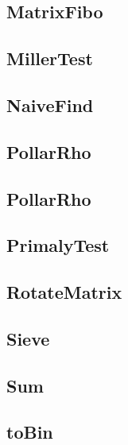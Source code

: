 \subsection{ MatrixFibo}
\raggedbottom
\hrulefill
\subsection{ MillerTest}
\raggedbottom
\hrulefill
\subsection{ NaiveFind}
\raggedbottom
\hrulefill
\subsection{ PollarRho}
\raggedbottom
\hrulefill
\subsection{ PollarRho}
\raggedbottom
\hrulefill
\subsection{ PrimalyTest}
\raggedbottom
\hrulefill
\subsection{ RotateMatrix}
\raggedbottom
\hrulefill
\subsection{ Sieve}
\raggedbottom
\hrulefill
\subsection{ Sum}
\raggedbottom
\hrulefill
\subsection{ toBin}
\raggedbottom
\hrulefill

